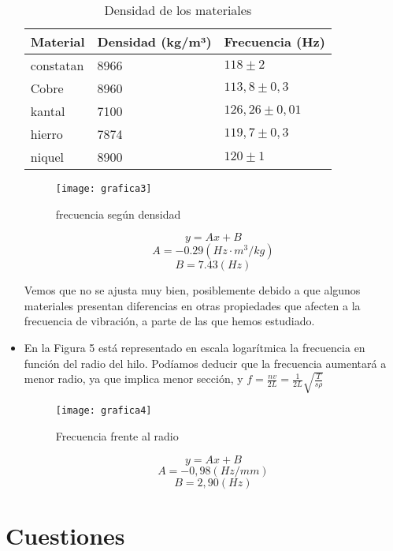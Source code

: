 \documentclass[a4paper,12pt,spanish]{article}
\begin{document}
\begin{itemize}
	
	\begin{table}[H]
		\centering
		\begin{tabular}{|l|l|l|}
			\hline
			Material  & Densidad (kg/m³)& Frecuencia (Hz) \\ \hline
			constatan & 8966    &  $118 \pm 2 $     \\ \hline
			Cobre     & 8960    &   $113,8\pm0,3$      \\ \hline
			kantal    & 7100    &   $126,26\pm0,01$      \\ \hline
			hierro    & 7874    &   $119,7\pm0,3$      \\ \hline
			niquel    & 8900    &     $120\pm1$    \\ \hline
		\end{tabular}
		\caption{Densidad de los materiales}
	\end{table}
	
	
	
	
	\begin{figure}[H]
		\centering
		\texttt{[image: grafica3]}
		\caption{frecuencia según densidad}
		\label{fig:grafica3}
	\end{figure}

	\[ y = Ax+B\]
	\[A = -0.29   (\si{Hz\cdot m^3/kg}) \]
	\[B = 7.43  (\si{Hz})  \]


	
	Vemos que no se ajusta muy bien, posiblemente debido a que algunos materiales presentan diferencias en otras propiedades que afecten a la frecuencia de vibración, a parte de las que hemos estudiado.
	
	\item{En la Figura 5 está representado en escala logarítmica la frecuencia en función del radio del hilo. Podíamos deducir que la frecuencia aumentará a menor radio, ya que implica menor sección, y $ f = \frac{nv}{2L} = \frac{1}{2L}\sqrt{\frac{T}{s\rho}} $}
	
	
	
	\begin{figure}[H]
		\centering
		\texttt{[image: grafica4]}
		\caption{Frecuencia frente al radio}
	\end{figure}
	
	\[ y = Ax+B\]
	\[A = -0,98   (\si{Hz/mm}) \]
	\[B = 2,90  (\si{Hz})  \]
	
	
	
\end{itemize}




\section{Cuestiones}
\end{document}
